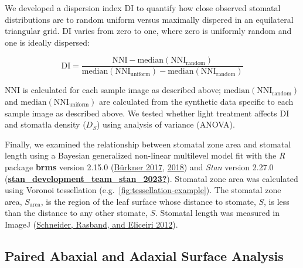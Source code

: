 \documentclass[12pt,halfline,a4paper,]{ouparticle}
\begin{document}
We developed a dispersion index \(\mathrm{DI}\) to quantify how close
observed stomatal distributions are to random uniform versus maximally
dispered in an equilateral triangular grid. \(\mathrm{DI}\) varies from
zero to one, where zero is uniformly random and one is ideally
dispersed:

\begin{equation}\label{eq:disp}
  \mathrm{DI} = \frac{\mathrm{NNI} - \text{median}(\mathrm{NNI_{random}})}{\text{median}(\mathrm{NNI_{uniform}}) - \text{median}(\mathrm{NNI_{random}})}
\end{equation}

\noindent \(\mathrm{NNI}\) is calculated for each sample image as
described above; \(\text{median}(\mathrm{NNI_{random}})\) and
\(\text{median}(\mathrm{NNI_{uniform}})\) are calculated from the
synthetic data specific to each sample image as described above. We
tested whether light treatment affects \(\mathrm{DI}\) and stomatla
density (\(D_S\)) using analysis of variance (ANOVA).

Finally, we examined the relationship between stomatal zone area and
stomatal length using a Bayesian generalized non-linear multilevel model
fit with the \emph{R} package \textbf{brms} version 2.15.0
(\protect\hyperlink{ref-burkner_brms_2017}{Bürkner 2017},
\protect\hyperlink{ref-burkner_advanced_2018}{2018}) and \emph{Stan}
version 2.27.0
(\protect\hyperlink{ref-stan_development_team_stan_2023}{\textbf{stan\_development\_team\_stan\_2023?}}).
Stomatal zone area was calculated using Voronoi tessellation
(e.g.~\autoref{fig:tessellation-example}). The stomatal zone area,
\(S_\text{area}\), is the region of the leaf surface whose distance to
stomate, \(S\), is less than the distance to any other stomate, \(S\).
Stomatal length was measured in ImageJ
(\protect\hyperlink{ref-schneider_nih_2012}{Schneider, Rasband, and
Eliceiri 2012}).

\hypertarget{paired-abaxial-and-adaxial-surface-analysis}{%
\subsection{Paired Abaxial and Adaxial Surface
Analysis}\label{paired-abaxial-and-adaxial-surface-analysis}}
\end{document}
